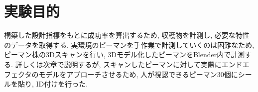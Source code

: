 \section{実験目的}
構築した設計指標をもとに成功率を算出するため, 収穫物を計測し, 必要な特性のデータを取得する.
実環境のピーマンを手作業で計測していくのは困難なため, ピーマン株の3Dスキャンを行い, 3Dモデル化したピーマンをBlender内で計測する.
詳しくは次章で説明するが, スキャンしたピーマンに対して実際にエンドエフェクタのモデルをアプローチさせるため, 人が視認できるピーマン30個にシールを貼り, ID付けを行った.
